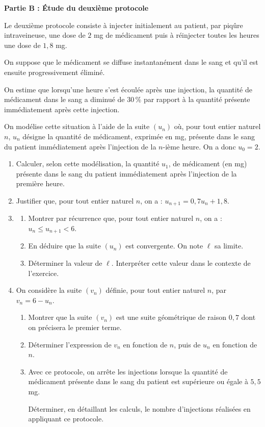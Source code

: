 \documentclass[10pt]{article}
\begin{document}
\bigskip

\textbf{Partie B : Étude du deuxième protocole}

\medskip

Le deuxième protocole consiste à injecter initialement au patient, par piqûre intraveineuse, une dose de $2$ mg de médicament puis à réinjecter toutes les heures une dose de $1,8$ mg.

On suppose que le médicament se diffuse instantanément dans le sang et qu'il est ensuite
progressivement éliminé.

On estime que lorsqu'une heure s'est écoulée après une injection, la quantité de médicament dans le sang a diminué de 30\,\% par rapport à la quantité présente immédiatement après cette injection.

On modélise cette situation à l'aide de la suite $\left(u_n\right)$ où, pour tout entier naturel $n$, $u_n$ désigne la quantité de médicament, exprimée en mg, présente dans le sang du patient immédiatement après l'injection de la $n$-ième heure. On a donc $u_0 = 2$.

\medskip

\begin{enumerate}
\item Calculer, selon cette modélisation, la quantité $u_1$, de médicament (en mg) présente dans le sang du patient immédiatement après l'injection de la première heure.
\item Justifier que, pour tout entier naturel $n$, on a : $u_{n+1} = 0,7u_n + 1,8$.
\item 
	\begin{enumerate}
		\item Montrer par récurrence que, pour tout entier naturel $n$, on a : $u_n \leqslant u_{n+1}  < 6$.
		\item En déduire que la suite $\left(u_n\right)$ est convergente. On note $\ell$ sa limite.
		\item Déterminer la valeur de $\ell$. Interpréter cette valeur dans le contexte de l'exercice.
	\end{enumerate}	
\item On considère la suite $\left(v_n\right)$ définie, pour tout entier naturel $n$, par $v_n = 6 - u_n$.
	\begin{enumerate}
		\item Montrer que la suite $\left(v_n\right)$ est une suite géométrique de raison $0,7$ dont on précisera le premier terme.
		\item Déterminer l'expression de $v_n$ en fonction de $n$, puis de $u_n$ en fonction de $n$.
		\item Avec ce protocole, on arrête les injections lorsque la quantité de médicament présente dans le sang du patient est supérieure ou égale à $5,5$ mg.

Déterminer, en détaillant les calculs, le nombre d'injections réalisées en appliquant ce protocole.
	\end{enumerate}
\end{enumerate}

\bigskip
\end{document}
